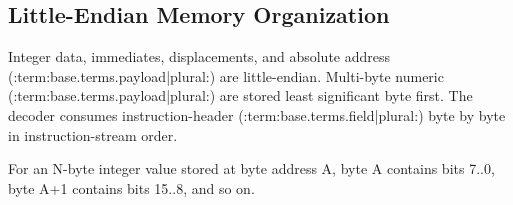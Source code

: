 \subsection{Little-Endian Memory Organization}
Integer data, immediates, displacements, and absolute address (:term:base.terms.payload|plural:) are little-endian. Multi-byte numeric
(:term:base.terms.payload|plural:) are stored least significant byte first. The decoder consumes instruction-header (:term:base.terms.field|plural:) byte by byte in
instruction-stream order.

For an N-byte integer value stored at byte address A, byte A contains bits 7..0, byte A+1 contains bits 15..8, and
so on.


